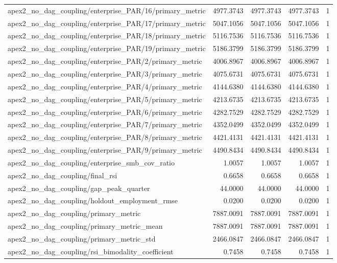 \begin{table}[h]
\begin{tabular}{lrrrr}
apex2_no_dag_coupling/enterprise_PAR/16/primary_metric & 4977.3743 & 4977.3743 & 4977.3743 & 1 \\
apex2_no_dag_coupling/enterprise_PAR/17/primary_metric & 5047.1056 & 5047.1056 & 5047.1056 & 1 \\
apex2_no_dag_coupling/enterprise_PAR/18/primary_metric & 5116.7536 & 5116.7536 & 5116.7536 & 1 \\
apex2_no_dag_coupling/enterprise_PAR/19/primary_metric & 5186.3799 & 5186.3799 & 5186.3799 & 1 \\
apex2_no_dag_coupling/enterprise_PAR/2/primary_metric & 4006.8967 & 4006.8967 & 4006.8967 & 1 \\
apex2_no_dag_coupling/enterprise_PAR/3/primary_metric & 4075.6731 & 4075.6731 & 4075.6731 & 1 \\
apex2_no_dag_coupling/enterprise_PAR/4/primary_metric & 4144.6380 & 4144.6380 & 4144.6380 & 1 \\
apex2_no_dag_coupling/enterprise_PAR/5/primary_metric & 4213.6735 & 4213.6735 & 4213.6735 & 1 \\
apex2_no_dag_coupling/enterprise_PAR/6/primary_metric & 4282.7529 & 4282.7529 & 4282.7529 & 1 \\
apex2_no_dag_coupling/enterprise_PAR/7/primary_metric & 4352.0499 & 4352.0499 & 4352.0499 & 1 \\
apex2_no_dag_coupling/enterprise_PAR/8/primary_metric & 4421.4131 & 4421.4131 & 4421.4131 & 1 \\
apex2_no_dag_coupling/enterprise_PAR/9/primary_metric & 4490.8434 & 4490.8434 & 4490.8434 & 1 \\
apex2_no_dag_coupling/enterprise_smb_cov_ratio & 1.0057 & 1.0057 & 1.0057 & 1 \\
apex2_no_dag_coupling/final_rsi & 0.6658 & 0.6658 & 0.6658 & 1 \\
apex2_no_dag_coupling/gap_peak_quarter & 44.0000 & 44.0000 & 44.0000 & 1 \\
apex2_no_dag_coupling/holdout_employment_rmse & 0.0200 & 0.0200 & 0.0200 & 1 \\
apex2_no_dag_coupling/primary_metric & 7887.0091 & 7887.0091 & 7887.0091 & 1 \\
apex2_no_dag_coupling/primary_metric_mean & 7887.0091 & 7887.0091 & 7887.0091 & 1 \\
apex2_no_dag_coupling/primary_metric_std & 2466.0847 & 2466.0847 & 2466.0847 & 1 \\
apex2_no_dag_coupling/rsi_bimodality_coefficient & 0.7458 & 0.7458 & 0.7458 & 1 \\

\end{tabular}
\end{table}
